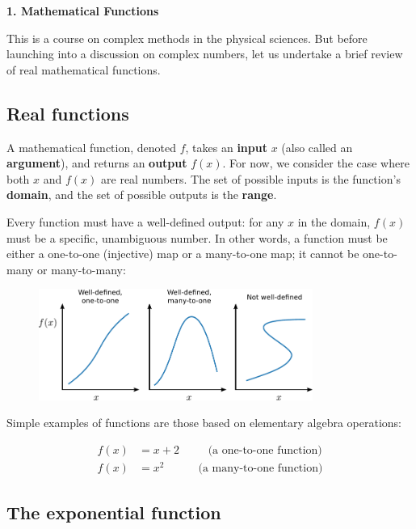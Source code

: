 \documentclass[10pt,a4paper]{article}
\begin{document}
\noindent
{\Large \textbf{1. Mathematical Functions}}
\vskip 0.2in

\label{mathematical-functions}

This is a course on complex methods in the physical sciences. But
before launching into a discussion on complex numbers, let us
undertake a brief review of real mathematical functions.

\subsection{Real functions}\label{real-functions}

A mathematical function, denoted $f$, takes an \textbf{input} $x$
(also called an \textbf{argument}), and returns an \textbf{output}
$f(x)$. For now, we consider the case where both $x$ and $f(x)$ are
real numbers. The set of possible inputs is the function's
\textbf{domain}, and the set of possible outputs is the
\textbf{range}.

Every function must have a well-defined output: for any $x$ in the
domain, $f(x)$ must be a specific, unambiguous number. In other words,
a function must be either a one-to-one (injective) map or a
many-to-one map; it cannot be one-to-many or many-to-many:

\begin{figure}[ht]
  \centering\includegraphics[width=0.8\textwidth]{mathfunctions}
\end{figure}

Simple examples of functions are those based on elementary algebra
operations:

\begin{align*}
  f(x) &= x + 2 \;\;\qquad \text{(a one-to-one function)} \\
  f(x) &= x^2 \quad\qquad \text{(a many-to-one function)}
\end{align*}

\subsection{The exponential function}
\label{exponential_function}
\end{document}
